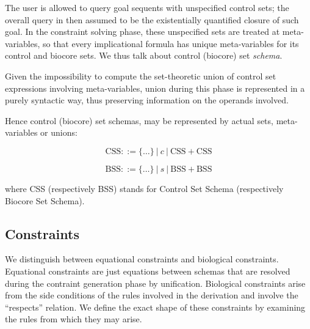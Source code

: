 The user is allowed to query goal sequents with unspecified control sets; the
overall query in then assumed to be the existentially quantified closure of such
goal. In the constraint solving phase, these unspecified sets are treated at
meta-variables, so that every implicational formula has unique meta-variables
for its control and biocore sets. We thus talk about control (biocore) set
\emph{schema}.

Given the impossibility to compute the set-theoretic union of control set
expressions involving meta-variables, union during this phase is represented in
a purely syntactic way, thus preserving information on the operands involved.

Hence control (biocore) set schemas, may be represented by actual sets,
meta-variables or unions:

\[
  \mathrm{CSS} ::= \{\dots\} \ | \ c \ | \ \mathrm{CSS} + \mathrm{CSS}
\]

\[
  \mathrm{BSS} ::= \{\dots\} \ | \ s \ | \ \mathrm{BSS} + \mathrm{BSS}
\]

where CSS (respectively BSS) stands for Control Set Schema (respectively Biocore
Set Schema).

\subsection{Constraints}

We distinguish between equational constraints and biological
constraints. Equational constraints are just equations between schemas that are
resolved during the contraint generation phase by unification. Biological
constraints arise from the side conditions of the rules involved in the
derivation and involve the ``respects'' relation.
We define the exact shape of these constraints by examining the rules from which
they may arise.


